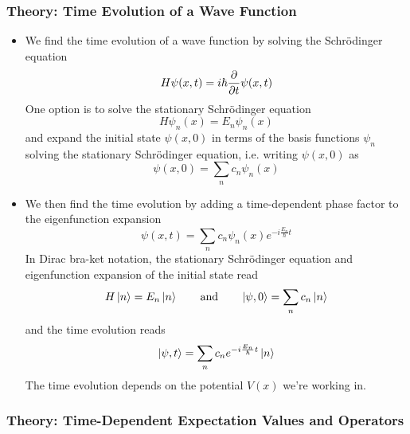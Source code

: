 \documentclass[11pt, a4paper]{article}
\newcommand{\eqtext}[1]{\qquad \text{#1} \qquad}
\newcommand{\schro}{Schr\"{o}dinger\xspace}
\begin{document}
\subsubsection{Theory: Time Evolution of a Wave Function}
\begin{itemize}
	\item We find the time evolution of a wave function by solving the \schro equation
	\begin{equation*}
		H\psi(x, t) = i\hbar \pdv{t}\psi(x, t)
	\end{equation*}
	One option is to solve the stationary \schro equation
	\begin{equation*}
		H \psi_{n}(x) = E_{n}\psi_{n}(x)
	\end{equation*}
	and expand the initial state $ \psi(x, 0) $ in terms of the basis functions $ \psi_{n} $ solving the stationary \schro equation, i.e. writing $ \psi(x, 0) $ as
	\begin{equation*}
		\psi(x, 0) = \sum_{n}c_{n}\psi_{n}(x)
	\end{equation*}
	\item We then find the time evolution by adding a time-dependent phase factor to the eigenfunction expansion
	\begin{equation*}
		\psi(x, t) = \sum_{n}c_{n}\psi_{n}(x)e^{-i\frac{E_{n}}{\hbar}t}
	\end{equation*}
	In Dirac bra-ket notation, the stationary \schro equation and eigenfunction expansion of the initial state read
	\begin{equation*}
		H\ket{n} = E_{n}\ket{n} \eqtext{and} \ket{\psi, 0} = \sum_{n}c_{n}\ket{n} 
	\end{equation*}
	and the time evolution reads
	\begin{equation*}
		\ket{\psi, t} = \sum_{n}c_{n} e^{-i\frac{E_{n}}{\hbar}t} \ket{n}
	\end{equation*}
	The time evolution depends on the potential $ V(x) $ we're working in.
\end{itemize}

\subsubsection{Theory: Time-Dependent Expectation Values and Operators}
\end{document}
